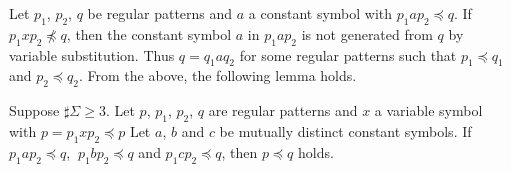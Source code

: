 
Let $p_{1}$, $p_{2}$, $q$ be regular patterns and $a$ a constant symbol with $p_{1}ap_{2} \preceq q$.
If $p_{1}xp_{2} \not\preceq q$, then the constant symbol $a$ in $p_{1}ap_{2}$ is not generated from $q$ by variable substitution.
Thus $q  = q_{1}aq_{2}$ for some regular patterns such that $p_{1} \preceq q_{1}$ and $p_{2} \preceq q_{2}$.
From the above, the following lemma holds.
%
\begin{lem}\label{Sato1:Lemma10}
    Suppose $\sharp \Sigma \geq 3$.
    Let $p$, $p_{1}$, $p_{2}$, $q$ are regular patterns and $x$ a variable symbol with $p = p_{1}xp_{2} \preceq p$
    Let $a$, $b$ and $c$ be mutually distinct constant symbols.
    If $p_{1}ap_{2} \preceq q$, $\ p_{1}bp_{2} \preceq q$ and $p_{1}cp_{2} \preceq q$, then $p \preceq q$ holds.
\end{lem}

